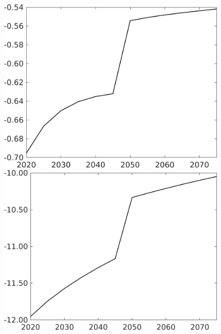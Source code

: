 \documentclass[12pt]{article}
\begin{document}
\begin{figure}[h!!]
\begin{minipage}[]{0.32\textwidth}
	\end{minipage}	
	\begin{minipage}[]{0.32\textwidth}
		\includegraphics[width=1\textwidth]{../../codding_model/own_basedOnFried/optimalPol_010922_revision/figures/all_13Sept22/CompTaufPER_bytaul_Reg0_Lf_spillover0_nsk1_xgr0_knspil0_sep1_LFlimit1_emsbase0_countec0_GovRev0_etaa0.79_lgd0.png}
	\end{minipage}		
	\begin{minipage}[]{0.32\textwidth}
		\includegraphics[width=1\textwidth]{../../codding_model/own_basedOnFried/optimalPol_010922_revision/figures/all_13Sept22/CompTaufPER_bytaul_Reg0_Lg_spillover0_nsk1_xgr0_knspil0_sep1_LFlimit1_emsbase0_countec0_GovRev0_etaa0.79_lgd0.png}

\end{minipage}
\end{figure}
\end{document}
